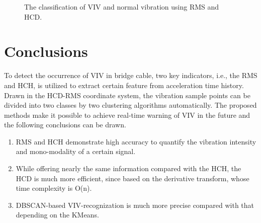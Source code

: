 \documentclass[preprint, 3p, times, compress, 11pt]{elsarticle}
\begin{document}
\begin{figure}[ht]
    \centering
    \caption{The classification of VIV and normal vibration using RMS and HCD.}
    \label{fig:label_dbscan}
\end{figure}

\clearpage

\section{Conclusions}
\label{sec:conclusion}

To detect the occurrence of VIV in bridge cable, two key indicators, i.e., 
the RMS and HCH, is utilized to extract certain feature from acceleration 
time history. Drawn in the HCD-RMS coordinate system, the vibration sample 
points can be divided into two classes by two clustering algorithms 
automatically. The proposed methods make it possible to achieve real-time 
warning of VIV in the future and the following conclusions can be drawn.

\begin{enumerate}[(1)]
    \item 
RMS and HCH demonstrate high accuracy to quantify the vibration intensity 
and mono-modality of a certain signal. 
    \item
While offering nearly the same information compared with the HCH, the 
HCD is much more efficient, since based on the derivative transform, 
whose time complexity is O(n).
    \item
DBSCAN-based VIV-recognization is much more precise compared with that 
depending on the KMeans.
\end{enumerate}


\end{document}

